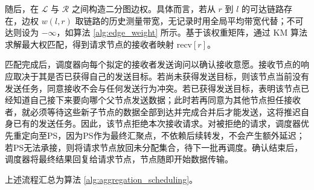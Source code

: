 \documentclass[master, vlined]{DissertUESTC}
\begin{document}
	随后，在 $\mathcal{L}$ 与 $\mathcal{R}$ 之间构造二分图边权。具体而言，若从 $r$ 到 $l$ 的可达链路存在，边权 $w(l,r)$ 取链路的历史测量带宽，无记录时用全局平均带宽代替；不可达则设为 $-\infty$，如算法 \ref{alg:edge_weight} 所示。基于该权重矩阵，通过 KM 算法求解最大权匹配，得到请求节点的接收者映射 $\mathrm{recv}[r]$。

	\begin{algorithm}[!htb]
		\caption{边权构造算法}
		\label{alg:edge_weight}
		\BlankLine
	\end{algorithm}

	匹配完成后，调度器向每个拟定的接收者发送询问以确认接收意愿。接收节点的响应取决于其是否已获得自己的发送目标。若尚未获得发送目标，则该节点当前没有发送任务，同意接收不会与任何发送行为冲突。若已获得发送目标，表明该节点已经知道自己接下来要向哪个父节点发送数据；此时若再同意为其他节点担任接收者，就必须等待这些新子节点的数据全部到达并完成合并后才能发送，这将推迟自身已有的发送任务。因此，该节点拒绝本次接收请求。对被拒绝的请求，调度器优先重定向至PS，因为PS作为最终汇聚点，不依赖后续转发，不会产生额外延迟；若PS无法承接，则将请求节点放回未分配集合，待下一批再调度。确认结束后，调度器将最终结果回复给请求节点，节点随即开始数据传输。

	上述流程汇总为算法 \ref{alg:aggregation_scheduling}。
\end{document}
